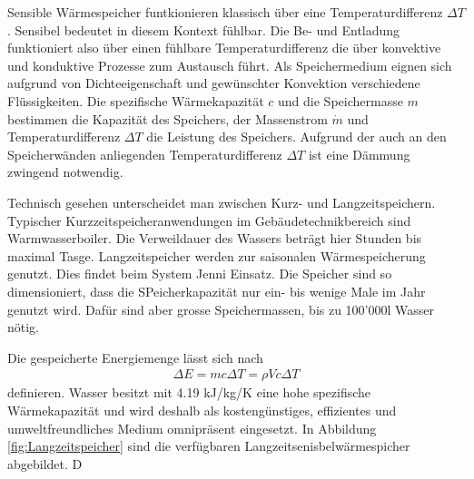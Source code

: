 \documentclass[11pt,a4paper]{scrartcl}
\begin{document}
Sensible Wärmespeicher funtkionieren klassisch über eine Temperaturdifferenz
$\Delta T$. Sensibel bedeutet in diesem Kontext \flqq fühlbar\frqq{}. Die
Be- und Entladung funktioniert also über einen \flqq fühlbare\frqq{}
Temperaturdifferenz die über konvektive und konduktive Prozesse zum Austausch
führt. Als Speichermedium eignen sich aufgrund von Dichteeigenschaft und
gewünschter Konvektion verschiedene Flüssigkeiten. Die spezifische
Wärmekapazität $c$ und die Speichermasse $m$ bestimmen die Kapazität des
Speichers, der Massenstrom $\dot{m}$ und Temperaturdifferenz $\Delta T$ die
Leistung des Speichers. Aufgrund der auch an den Speicherwänden anliegenden
Temperaturdifferenz $\Delta T$ ist eine Dämmung zwingend notwendig. 

Technisch gesehen unterscheidet man zwischen Kurz- und Langzeitspeichern.
Typischer Kurzzeitspeicheranwendungen im Gebäudetechnikbereich sind
Warmwasserboiler. Die Verweildauer des Wassers beträgt hier Stunden bis maximal
Tasge. Langzeitspeicher werden zur saisonalen Wärmespeicherung genutzt. Dies
findet beim System Jenni Einsatz. Die Speicher sind so dimensioniert, dass die
SPeicherkapazität nur ein- bis wenige Male im Jahr genutzt wird. Dafür sind aber
grosse Speichermassen, bis zu 100'000l Wasser nötig.

Die gespeicherte Energiemenge lässt sich nach
\begin{align}
\Delta E = mc\Delta T = \rho Vc \Delta T
\end{align}
definieren. Wasser besitzt mit 4.19 kJ/kg/K eine hohe spezifische
Wärmekapazität und wird deshalb als kostengünstiges, effizientes und
umweltfreundliches Medium omnipräsent eingesetzt.
In Abbildung \ref{fig:Langzeitspeicher} sind die verfügbaren
Langzeitsenisbelwärmespicher abgebildet. D
\end{document}
